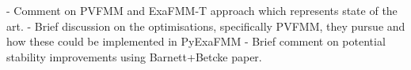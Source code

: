 - Comment on PVFMM and ExaFMM-T approach which represents state of the art.
    - Brief discussion on the optimisations, specifically PVFMM,
    they pursue and how these could be implemented in PyExaFMM
    - Brief comment on potential stability improvements using Barnett+Betcke
    paper.
